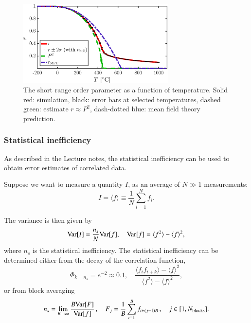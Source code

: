 \begin{figure}[!ht]
\begin{center}
  \includegraphics[width=0.7\textwidth]{../figures/r} 
  \caption{The short range order parameter as a function of temperature. Solid red: simulation, black: error bars at selected temperatures, dashed green: estimate $r \approx P^2$, dash-dotted blue: mean field theory prediction. }
  \label{fig:r}
\end{center}
\end{figure}




\subsubsection*{Statistical inefficiency}
\label{sec:ns}
As described in the Lecture notes, the statistical inefficiency can be used to obtain error estimates of correlated data. 

Suppose we want to measure a quantity $I$, as an average of $N\gg1$ measurements: 
\begin{equation}
I = \langle f \rangle \equiv \frac{1}{N}\sum_{i = 1}^N f_i.
\end{equation}

The variance is then given by 
\begin{equation}
{\rm Var}[I] = \frac{n_s}{N}{\rm Var}[f], \quad {\rm Var}[f] = \langle f^2 \rangle - \langle f \rangle^2,
\end{equation}
where $n_s$ is the statistical inefficiency. 
The statistical inefficiency can be determined either from the decay of the correlation function, 
\begin{equation}
\Phi_{k = n_s} = e^{-2} \approx 0.1, \quad \frac{\langle f_i f_{i+k}\rangle - \langle f \rangle^2}{\langle f^2\rangle - \langle f \rangle^2},
\label{eq:ns_Phi}
\end{equation}
or from block averaging
\begin{equation}
n_s = \lim_{B \rightarrow \infty} \frac{B {\rm Var}[F]}{{\rm Var}[f]}\,, \quad F_j = \frac{1}{B}\sum_{i = 1}^B f_{i + (j-1)B}\,, \quad j \in [1, N_{\rm blocks} ].
\label{eq:ns_block}
\end{equation}

